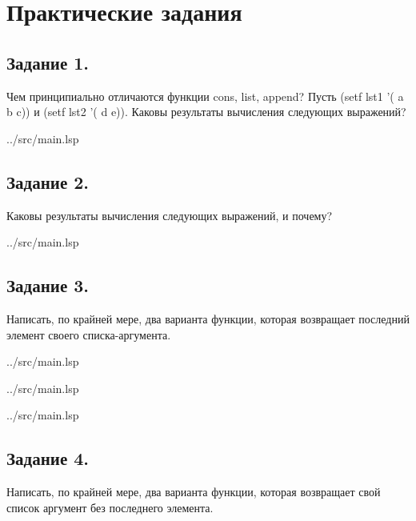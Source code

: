 \chapter{Практические задания}

\section*{Задание 1.}
Чем принципиально отличаются функции cons, list, append? Пусть (setf lst1 '( a b c))  и (setf lst2 '( d e)). Каковы результаты вычисления следующих выражений?

\begin{lstinputlisting}[
	caption={Задание 1},
	label={lst:t1},
	style={lsp},
	linerange={1-6},
	]{../src/main.lsp}
\end{lstinputlisting}

\section*{Задание 2.}
 Каковы   результаты   вычисления   следующих   выражений,   и   почему?

\begin{lstinputlisting}[
	caption={Задание 2},
	label={lst:t2},
	style={lsp},
	linerange={8-17},
	]{../src/main.lsp}
\end{lstinputlisting}

\section*{Задание 3.}
Написать, по крайней мере, два варианта функции, которая возвращает последний элемент своего списка-аргумента.
\begin{lstinputlisting}[
	caption={Задание 3, вариант 1},
	label={lst:t3-1},
	style={lsp},
	linerange={27-39},
	]{../src/main.lsp}
\end{lstinputlisting}

\begin{lstinputlisting}[
	caption={Задание 3, вариант 2},
	label={lst:t3-2},
	style={lsp},
	linerange={23-25},
	]{../src/main.lsp}
\end{lstinputlisting}

\begin{lstinputlisting}[
	caption={Задание 3, вариант 3},
	label={lst:t3-3},
	style={lsp},
	linerange={19-21},
	]{../src/main.lsp}
\end{lstinputlisting}


\section*{Задание 4.}
Написать, по крайней мере, два варианта функции, которая возвращает свой список аргумент без последнего элемента.
\clearpage

